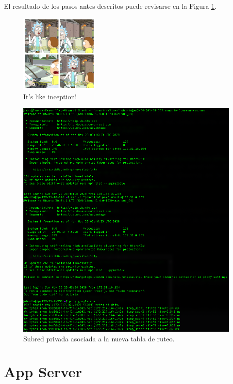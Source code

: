 \documentclass{article}
\begin{document}
El resultado de los pasos antes descritos puede
revisarse en la Figura \ref{fig:NAT-result}.
\begin{figure}[H]
  \centering
  \includegraphics[width=0.35\textwidth]{SSNAT/inception}
  \caption{It's like inception!}
\end{figure}

\begin{figure}[H]
  \centering
  \includegraphics[width=\textwidth]{SSNAT/result}
  \caption{Subred privada asociada a la nueva tabla
  de ruteo.}
  \label{fig:NAT-result}
\end{figure}


\section{App Server}
\end{document}
